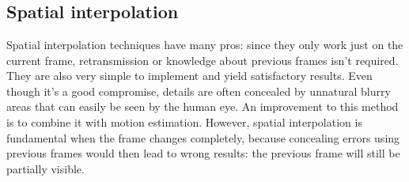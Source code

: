 \section[The rationale of why these methods were chosen, and a discussion of their advantages and disadvantages.]{}

\subsection{Spatial interpolation}
Spatial interpolation techniques have many pros: since they only work just on the current frame, retransmission or knowledge about previous frames isn't required. They are also very simple to implement and yield satisfactory results. Even though it's a good compromise, details are often concealed by unnatural blurry areas that can easily be seen by the human eye. An improvement to this method is to combine it with motion estimation. However, spatial interpolation is fundamental when the frame changes completely, because concealing errors using previous frames would then lead to wrong results: the previous frame will still be partially visible.

